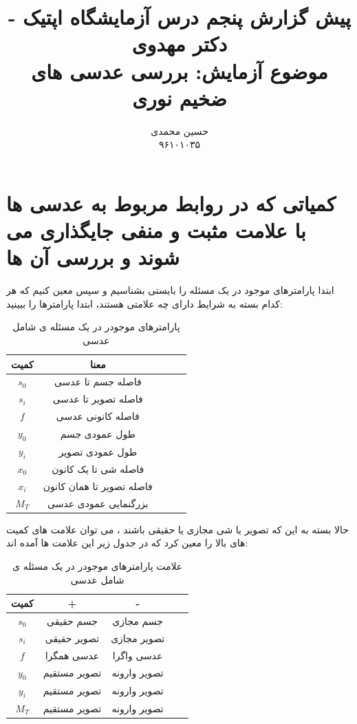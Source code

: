 \documentclass{article}
\title{	
	پیش گزارش پنجم درس آزمایشگاه اپتیک - دکتر مهدوی
	\\
	\small
	موضوع آزمايش: بررسی عدسی های ضخيم
	نوری
}
\author{
حسین محمدی 
\\
۹۶۱۰۱۰۳۵
}
\begin{document}
\maketitle
\section{کمیاتی که در روابط مربوط به عدسی ها با علامت مثبت و منفی جایگذاری می شوند و بررسی آن ها}
ابتدا پارامترهای موجود در یک مسئله را بایستی بشناسیم و سپس معین کنیم که هر کدام بسته به شرایط دارای چه علامتی هستند، ابتدا پارامترها را ببینید:
\begin{table}[h]
	\centering
	\caption{پارامترهای موجودر در یک مسئله ی شامل عدسی}
	\begin{tabular}{|c|c|c|c|c|}
		\hline
		کمیت & معنا \\
		\hline
		$s_0$ & فاصله جسم تا عدسی \\
		\hline
		$s_i$ & فاصله تصویر تا عدسی \\
		\hline
		$f$ & فاصله کانونی عدسی \\
		\hline
		$y_0$ & طول عمودی جسم \\
		\hline
		$y_i$ & طول عمودی تصویر \\
		\hline
		$x_0$ & فاصله شی تا یک کانون \\
		\hline
		$x_i$ & فاصله تصویر تا همان کانون \\
		\hline
		$M_T$ & بزرگنمایی عمودی عدسی \\
		\hline
	\end{tabular}
\end{table}
حالا بسته به این که تصویر یا شی مجازی یا حقیقی باشند ، می توان علامت های کمیت های بالا را معین کرد که در جدول زیر این علامت ها آمده اند:
\begin{table}[h]
	\centering
	\caption{ علامت پارامترهای موجودر در یک مسئله ی شامل عدسی}
	\begin{tabular}{|c|c|c|c|c|}
		\hline
		کمیت & + & - \\
	\hline
	$s_0$ & جسم حقیقی & جسم مجازی	\\ \hline
	$s_i$ & تصویر حقیقی & تصویر مجازی  \\ \hline
	$f$ & عدسی همگرا & عدسی واگرا\\ \hline
	$y_0$ & تصویر مستقیم & تصویر وارونه\\ \hline
	$y_i$ & تصویر مستقیم & تصویر وارونه\\ \hline
	$M_T$ & تصویر مستقیم& تصویر وارونه\\ \hline
	\end{tabular}
\end{table}
\end{document}
